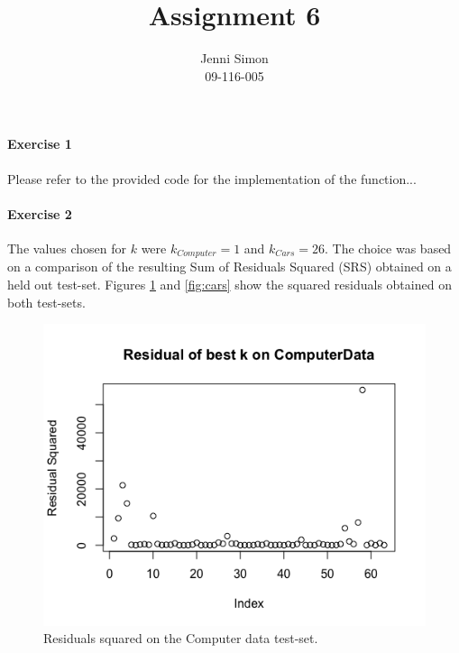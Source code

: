 \documentclass{paper}
\title{Assignment 6}
\author{Jenni Simon\\09-116-005}
\begin{document}
\maketitle


%


\paragraph{Exercise 1}

Please refer to the provided code for the implementation of the function...

\paragraph{Exercise 2}

The values chosen for $k$ were $k_{Computer}=1$ and $k_{Cars}=26$. The choice was based on a comparison of the resulting Sum of Residuals Squared (SRS) obtained on a held out test-set. Figures \ref{fig:comp} and \ref{fig:cars} show the squared residuals obtained on both test-sets.

\begin{figure}[h]
\begin{center}
\includegraphics[width=0.8\linewidth]{comp}
\end{center}
\caption{Residuals squared on the Computer data test-set. }
\label{fig:comp}
\end{figure}
\end{document}
